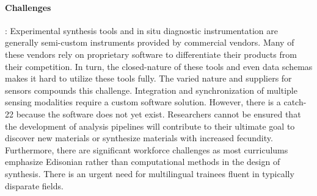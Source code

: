 \paragraph*{\textbf{Challenges}}: Experimental synthesis tools and in situ diagnostic instrumentation are generally semi-custom instruments provided by commercial vendors. Many of these vendors rely on proprietary software to differentiate their products from their competition. In turn, the closed-nature of these tools and even data schemas makes it hard to utilize these tools fully. The varied nature and suppliers for sensors compounds this challenge. Integration and synchronization of multiple sensing modalities require a custom software solution. However, there is a catch-22 because the software does not yet exist. Researchers cannot be ensured that the development of analysis pipelines will contribute to their ultimate goal to discover new materials or synthesize materials with increased fecundity. Furthermore, there are significant workforce challenges as most curriculums emphasize Edisonian rather than computational methods in the design of synthesis. There is an urgent need for multilingual trainees fluent in typically disparate fields. 

        
